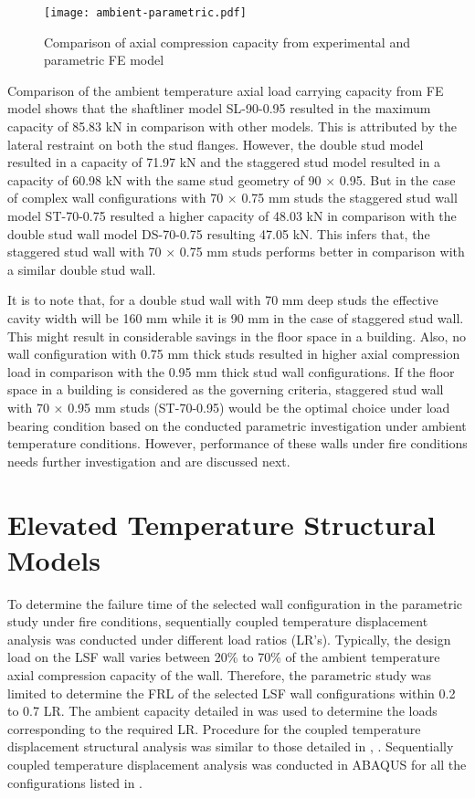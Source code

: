 \begin{figure}[!htbp]
	\centering
	\texttt{[image: ambient-parametric.pdf]}
	\caption{Comparison of axial compression capacity from experimental and parametric FE model}
	\label{fig:ambient-parametric}
\end{figure}

Comparison of the ambient temperature axial load carrying capacity from FE model shows that the shaftliner model SL-90-0.95 resulted in the maximum capacity of 85.83 kN in comparison with other models. This is attributed by the lateral restraint on both the stud flanges. However, the double stud model resulted in a capacity of 71.97 kN and the staggered stud model resulted in a capacity of 60.98 kN with the same stud geometry of 90 $\times$ 0.95. But in the case of complex wall configurations with 70 $\times$ 0.75 mm studs the staggered stud wall model ST-70-0.75 resulted a higher capacity of 48.03 kN in comparison with the double stud wall model DS-70-0.75 resulting 47.05 kN. This infers that, the staggered stud wall with 70 $\times$ 0.75 mm studs performs better in comparison with a similar double stud wall. 

It is to note that, for a double stud wall with 70 mm deep studs the effective cavity width will be 160 mm while it is 90 mm in the case of staggered stud wall. This might result in considerable savings in the floor space in a building. Also, no wall configuration with 0.75 mm thick studs resulted in higher axial compression load in comparison with the 0.95 mm thick stud wall configurations. If the floor space in a building is considered as the governing criteria, staggered stud wall with 70 $\times$ 0.95 mm studs (ST-70-0.95) would be the optimal choice under load bearing condition based on the conducted parametric investigation under ambient temperature conditions. However, performance of these walls under fire conditions needs further investigation and are discussed next.  

\section{Elevated Temperature Structural Models}

To determine the failure time of the selected wall configuration in the parametric study under fire conditions, sequentially coupled temperature displacement analysis was conducted under different load ratios (LR's). Typically, the design load on the LSF wall varies between 20\% to 70\% of the ambient temperature axial compression capacity of the wall. Therefore, the parametric study was limited to determine the FRL of the selected LSF wall configurations within 0.2 to 0.7 LR. The ambient capacity detailed in  was used to determine the loads corresponding to the required LR. Procedure for the coupled temperature displacement structural analysis was similar to those detailed in , . Sequentially coupled temperature displacement analysis was conducted in ABAQUS for all the configurations listed in . 

